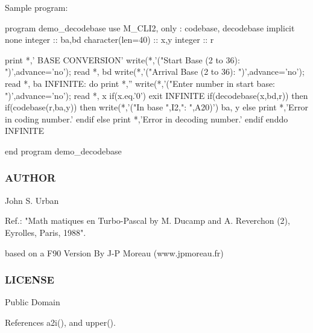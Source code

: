 Sample program\+: \begin{DoxyVerb} program demo_decodebase
 use M_CLI2, only : codebase, decodebase
 implicit none
 integer           :: ba,bd
 character(len=40) :: x,y
 integer           :: r

 print *,' BASE CONVERSION'
 write(*,'("Start   Base (2 to 36): ")',advance='no'); read *, bd
 write(*,'("Arrival Base (2 to 36): ")',advance='no'); read *, ba
 INFINITE: do
    print *,''
    write(*,'("Enter number in start base: ")',advance='no'); read *, x
    if(x.eq.'0') exit INFINITE
    if(decodebase(x,bd,r)) then
       if(codebase(r,ba,y)) then
         write(*,'("In base ",I2,": ",A20)')  ba, y
       else
         print *,'Error in coding number.'
       endif
    else
       print *,'Error in decoding number.'
    endif
 enddo INFINITE

 end program demo_decodebase
\end{DoxyVerb}


\subsubsection*{A\+U\+T\+H\+OR}

John S. Urban

Ref.\+: "Math matiques en Turbo-\/\+Pascal by M. Ducamp and A. Reverchon (2), Eyrolles, Paris, 1988".

based on a F90 Version By J-\/P Moreau (www.\+jpmoreau.\+fr)

\subsubsection*{L\+I\+C\+E\+N\+SE}

Public Domain 

References a2i(), and upper().

